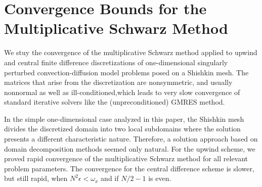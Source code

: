 \section{Convergence Bounds for the Multiplicative Schwarz Method}\label{1D:SchBnds}

We stuy the convergence of the multiplicative Schwarz method applied to upwind
and central finite difference discretizations of one-dimensional singularly
perturbed convection-diffusion model problems posed on a Shishkin mesh. The
matrices that arise from the discretization are nonsymmetric, and usually
nonnormal as well as ill-conditioned,which leads to very slow convergence of
standard iterative solvers like the (unpreconditioned) GMRES method.

In the simple one-dimensional case analyzed in this paper, the Shishkin mesh
divides the discretized domain into two local subdomains where the solution
presents a different characteristic nature. Therefore, a solution approach
based on domain decomposition methods seemed only natural. For the upwind
scheme, we proved rapid convergence of the multiplicative Schwarz method for
all relevant problem parameters. The convergence for the central difference
scheme is slower, but still rapid, when $N^2\epsilon < \omega_x$ and if $N/2-1$
is even.


